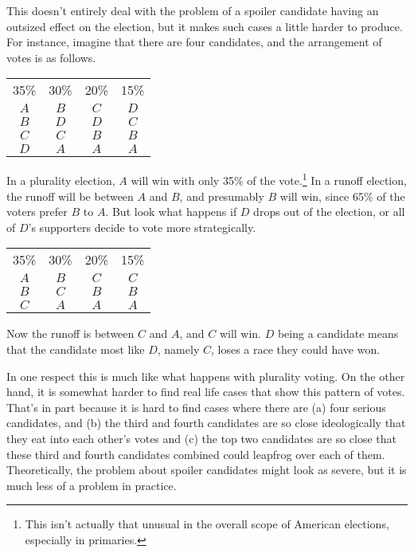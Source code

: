 \begin{multicols}{2}
This doesn't entirely deal with the problem of a spoiler candidate having an outsized effect on the election, but it makes such cases a little harder to produce. For instance, imagine that there are four candidates, and the arrangement of votes is as follows.

\begin{center}
\begin{tabular}{c c c c}
35\% & 30\% & 20\% & 15\% \\ 
$A$ & $B$ & $C$ & $D$ \\
$B$ & $D$ & $D$ & $C$ \\
$C$ & $C$ & $B$ & $B$ \\
$D$ & $A$ & $A$ & $A$
\end{tabular}
\end{center}
In a plurality election, $A$ will win with only 35\% of the vote.\footnote{This isn't actually that unusual in the overall scope of American elections, especially in primaries.} In a runoff election, the runoff will be between $A$ and $B$, and presumably $B$ will win, since 65\% of the voters prefer $B$ to $A$. But look what happens if $D$ drops out of the election, or all of $D$'s supporters decide to vote more strategically.

\begin{center}
\begin{tabular}{c c c c}
35\% & 30\% & 20\% & 15\% \\ 
$A$ & $B$ & $C$ & $C$ \\
$B$ & $C$ & $B$ & $B$ \\
$C$ & $A$ & $A$ & $A$ \\
\end{tabular}
\end{center}
Now the runoff is between $C$ and $A$, and $C$ will win. $D$ being a candidate means that the candidate most like $D$, namely $C$, loses a race they could have won.

In one respect this is much like what happens with plurality voting. On the other hand, it is somewhat harder to find real life cases that show this pattern of votes. That's in part because it is hard to find cases where there are (a) four serious candidates, and (b) the third and fourth candidates are so close ideologically that they eat into each other's votes and (c) the top two candidates are so close that these third and fourth candidates combined could leapfrog over each of them. Theoretically, the problem about spoiler candidates might look as severe, but it is much less of a problem in practice.


\end{multicols}
